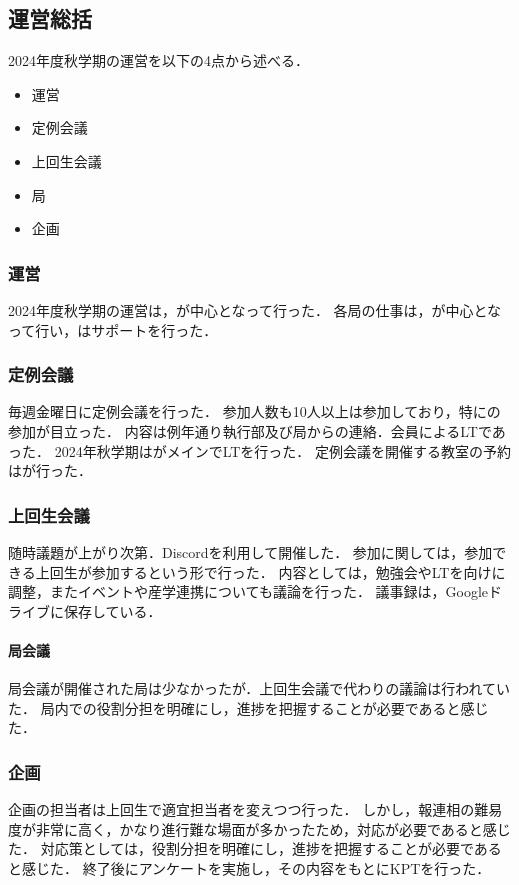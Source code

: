 \subsection*{運営総括}


2024年度秋学期の運営を以下の4点から述べる．
\begin{itemize}
    \item 運営
    \item 定例会議
    \item 上回生会議
    \item 局
    \item 企画
\end{itemize}

\subsubsection*{運営}
2024年度秋学期の運営は，\thirdGrade{}が中心となって行った．
各局の仕事は\firstGrade{}，\secondGrade{}が中心となって行い，\thirdGrade{}はサポートを行った．

\subsubsection*{定例会議}
毎週金曜日に定例会議を行った．
参加人数も10人以上は参加しており，特に\firstGrade{}の参加が目立った．
内容は例年通り執行部及び局からの連絡．会員によるLTであった．
2024年秋学期は\firstGrade{}がメインでLTを行った．
定例会議を開催する教室の予約は\kensuiChief{}が行った．

\subsubsection*{上回生会議}
随時議題が上がり次第．Discordを利用して開催した．
参加に関しては，参加できる上回生が参加するという形で行った．
内容としては，勉強会やLTを\firstGrade{}向けに調整，またイベントや産学連携についても議論を行った．
議事録は，Googleドライブに保存している．

\paragraph*{局会議}
局会議が開催された局は少なかったが．上回生会議で代わりの議論は行われていた．
局内での役割分担を明確にし，進捗を把握することが必要であると感じた．

\subsubsection*{企画}
企画の担当者は上回生で適宜担当者を変えつつ行った．
しかし，報連相の難易度が非常に高く，かなり進行難な場面が多かったため，対応が必要であると感じた．
対応策としては，役割分担を明確にし，進捗を把握することが必要であると感じた．
終了後にアンケートを実施し，その内容をもとにKPTを行った．
